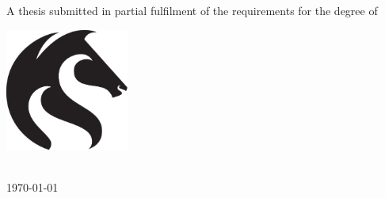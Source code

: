 
\begin{titlepage}
\makeatletter

	\vspace*{\fill}

	\huge\textbf{\textsf{\@title}}

	\vspace{0.5cm}\par
	\begin{center}
		\LARGE\textbf{\@author}
	\end{center}
		
	\vspace{0.5cm}\par
	\Large{A thesis submitted in partial fulfilment of the requirements for the degree of \degree}

	\vspace{1cm}\par

	\begin{center}
		\includegraphics[height=4cm]{images/title/uon_logo}
		\vspace{1cm}\par
		\Large{\institute \\ \today}
	\end{center}

	\vspace*{\fill}

\makeatother
\end{titlepage}
